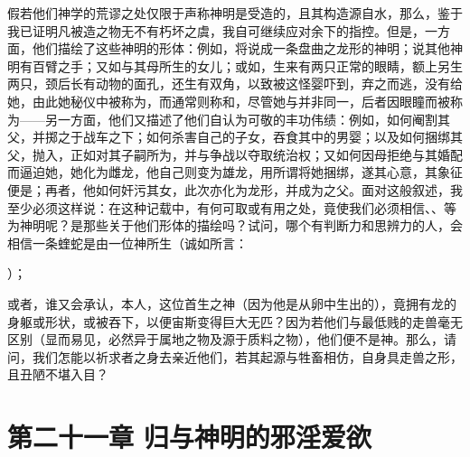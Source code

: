 假若他们神学的荒谬之处仅限于声称神明是受造的，且其构造源自水，那么，鉴于我已证明凡被造之物无不有朽坏之虞，我自可继续应对余下的指控。但是，一方面，他们描绘了这些神明的形体：例如，将说成一条盘曲之龙形的神明；说其他神明有百臂之手；又如与其母所生的女儿；或如，生来有两只正常的眼睛，额上另生两只，颈后长有动物的面孔，还生有双角，以致被这怪婴吓到，弃之而逃，没有给她，由此她秘仪中被称为，而通常则称和，尽管她与并非同一，后者因眼瞳而被称为——另一方面，他们又描述了他们自认为可敬的丰功伟绩：例如，如何阉割其父，并掷之于战车之下；如何杀害自己的子女，吞食其中的男婴；以及如何捆绑其父，抛入，正如对其子嗣所为，并与争战以夺取统治权；又如何因母拒绝与其婚配而逼迫她，她化为雌龙，他自己则变为雄龙，用所谓将她捆绑，遂其心意，其象征便是；再者，他如何奸污其女，此次亦化为龙形，并成为之父。面对这般叙述，我至少必须这样说：在这种记载中，有何可取或有用之处，竟使我们必须相信、、等为神明呢？是那些关于他们形体的描绘吗？试问，哪个有判断力和思辨力的人，会相信一条蝰蛇是由一位神所生（诚如所言：\par

）；\par

或者，谁又会承认，本人，这位首生之神（因为他是从卵中生出的），竟拥有龙的身躯或形状，或被吞下，以便宙斯变得巨大无匹？因为若他们与最低贱的走兽毫无区别（显而易见，必然异于属地之物及源于质料之物），他们便不是神。那么，请问，我们怎能以祈求者之身去亲近他们，若其起源与牲畜相仿，自身具走兽之形，且丑陋不堪入目？\par


\section{第二十一章 归与神明的邪淫爱欲}

